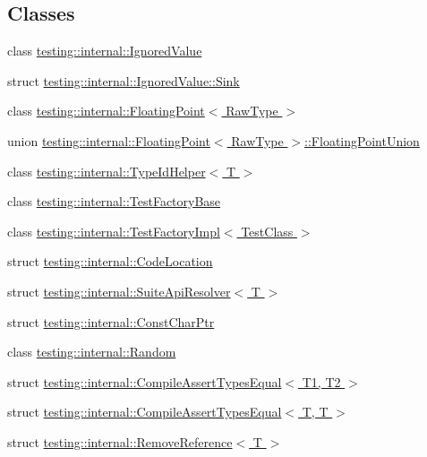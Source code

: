 \subsection*{Classes}
\begin{DoxyCompactItemize}
\item 
class \hyperlink{classtesting_1_1internal_1_1IgnoredValue}{testing\+::internal\+::\+Ignored\+Value}
\item 
struct \hyperlink{structtesting_1_1internal_1_1IgnoredValue_1_1Sink}{testing\+::internal\+::\+Ignored\+Value\+::\+Sink}
\item 
class \hyperlink{classtesting_1_1internal_1_1FloatingPoint}{testing\+::internal\+::\+Floating\+Point$<$ Raw\+Type $>$}
\item 
union \hyperlink{uniontesting_1_1internal_1_1FloatingPoint_1_1FloatingPointUnion}{testing\+::internal\+::\+Floating\+Point$<$ Raw\+Type $>$\+::\+Floating\+Point\+Union}
\item 
class \hyperlink{classtesting_1_1internal_1_1TypeIdHelper}{testing\+::internal\+::\+Type\+Id\+Helper$<$ T $>$}
\item 
class \hyperlink{classtesting_1_1internal_1_1TestFactoryBase}{testing\+::internal\+::\+Test\+Factory\+Base}
\item 
class \hyperlink{classtesting_1_1internal_1_1TestFactoryImpl}{testing\+::internal\+::\+Test\+Factory\+Impl$<$ Test\+Class $>$}
\item 
struct \hyperlink{structtesting_1_1internal_1_1CodeLocation}{testing\+::internal\+::\+Code\+Location}
\item 
struct \hyperlink{structtesting_1_1internal_1_1SuiteApiResolver}{testing\+::internal\+::\+Suite\+Api\+Resolver$<$ T $>$}
\item 
struct \hyperlink{structtesting_1_1internal_1_1ConstCharPtr}{testing\+::internal\+::\+Const\+Char\+Ptr}
\item 
class \hyperlink{classtesting_1_1internal_1_1Random}{testing\+::internal\+::\+Random}
\item 
struct \hyperlink{structtesting_1_1internal_1_1CompileAssertTypesEqual}{testing\+::internal\+::\+Compile\+Assert\+Types\+Equal$<$ T1, T2 $>$}
\item 
struct \hyperlink{structtesting_1_1internal_1_1CompileAssertTypesEqual_3_01T_00_01T_01_4}{testing\+::internal\+::\+Compile\+Assert\+Types\+Equal$<$ T, T $>$}
\item 
struct \hyperlink{structtesting_1_1internal_1_1RemoveReference}{testing\+::internal\+::\+Remove\+Reference$<$ T $>$}
\item 

\end{DoxyCompactItemize}
